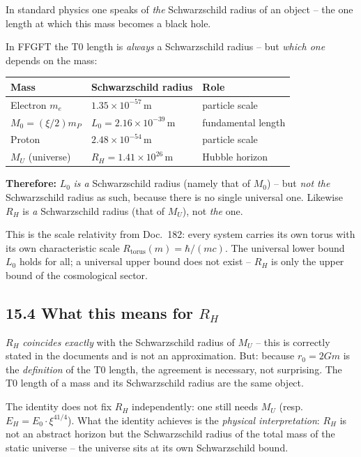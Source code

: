 In standard physics one speaks of \emph{the} Schwarzschild radius
of an object -- the one length at which this mass becomes a black hole.

In FFGFT the T0 length is \emph{always} a Schwarzschild radius --
but \emph{which one} depends on the mass:

\begin{center}
\begin{tabular}{lll}
\toprule
\textbf{Mass} & \textbf{Schwarzschild radius} & \textbf{Role} \\
\midrule
Electron $m_e$ & $1{.}35\times10^{-57}$\,m & particle scale \\
$M_0 = (\xi/2)m_P$ & $L_0 = 2{.}16\times10^{-39}$\,m & fundamental length \\
Proton & $2{.}48\times10^{-54}$\,m & particle scale \\
$M_U$ (universe) & $R_H = 1{.}41\times10^{26}$\,m & Hubble horizon \\
\bottomrule
\end{tabular}
\end{center}

\textbf{Therefore:} $L_0$ \emph{is a} Schwarzschild radius
(namely that of $M_0$) -- but \emph{not the} Schwarzschild radius
as such, because there is no single universal one.
Likewise $R_H$ is \emph{a} Schwarzschild radius (that of $M_U$),
not \emph{the} one.

This is the scale relativity from Doc.~182: every system carries
its own torus with its own characteristic scale
$R_\mathrm{torus}(m) = \hbar/(mc)$. The universal lower bound $L_0$
holds for all; a universal upper bound does not exist --
$R_H$ is only the upper bound of the cosmological sector.

\subsection*{15.4 What this means for $R_H$}

$R_H$ \emph{coincides exactly} with the Schwarzschild radius of $M_U$ --
this is correctly stated in the documents and is not an approximation.
But: because $r_0 = 2Gm$ is the \emph{definition} of the T0 length,
the agreement is necessary, not surprising. The T0 length
of a mass and its Schwarzschild radius are the same object.

The identity does not fix $R_H$ independently: one still needs
$M_U$ (resp.\ $E_H = E_0\cdot\xi^{41/4}$). What the identity achieves
is the \emph{physical interpretation}: $R_H$ is not an abstract
horizon but the Schwarzschild radius of the total mass of the
static universe -- the universe sits at its own
Schwarzschild bound.

